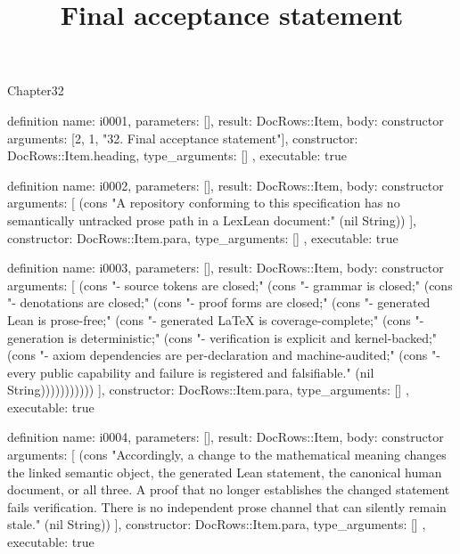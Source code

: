 \begin{lexlean}{Chapter32}
\title{Final acceptance statement}
\begin{semanticmodule}
definition{
  name: i0001,
  parameters: [],
  result: DocRows::Item,
  body: constructor{
    arguments: [2, 1, "32. Final acceptance statement"],
    constructor: DocRows::Item.heading,
    type_arguments: []
  },
  executable: true
}

definition{
  name: i0002,
  parameters: [],
  result: DocRows::Item,
  body: constructor{
    arguments: [
      (cons "A repository conforming to this specification has no semantically untracked prose path in a LexLean document:" (nil String))
    ],
    constructor: DocRows::Item.para,
    type_arguments: []
  },
  executable: true
}

definition{
  name: i0003,
  parameters: [],
  result: DocRows::Item,
  body: constructor{
    arguments: [
      (cons "- source tokens are closed;" (cons "- grammar is closed;" (cons "- denotations are closed;" (cons "- proof forms are closed;" (cons "- generated Lean is prose-free;" (cons "- generated LaTeX is coverage-complete;" (cons "- generation is deterministic;" (cons "- verification is explicit and kernel-backed;" (cons "- axiom dependencies are per-declaration and machine-audited;" (cons "- every public capability and failure is registered and falsifiable." (nil String)))))))))))
    ],
    constructor: DocRows::Item.para,
    type_arguments: []
  },
  executable: true
}

definition{
  name: i0004,
  parameters: [],
  result: DocRows::Item,
  body: constructor{
    arguments: [
      (cons "Accordingly, a change to the mathematical meaning changes the linked semantic object, the generated Lean statement, the canonical human document, or all three. A proof that no longer establishes the changed statement fails verification. There is no independent prose channel that can silently remain stale." (nil String))
    ],
    constructor: DocRows::Item.para,
    type_arguments: []
  },
  executable: true
}
\end{semanticmodule}
\end{lexlean}
